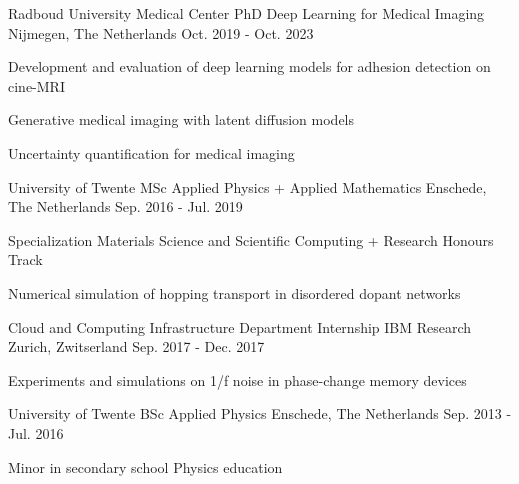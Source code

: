 

\begin{cventries}

  \cventry
    {Radboud University Medical Center} %
    {PhD Deep Learning for Medical Imaging} %
    {Nijmegen, The Netherlands} %
    {Oct. 2019 - Oct. 2023} %
    {
      \begin{cvitems} %
        \item {Development and evaluation of deep learning models for adhesion detection on cine-MRI}
        \item {Generative medical imaging with latent diffusion models}
        \item {Uncertainty quantification for medical imaging}
      \end{cvitems}
    }

  \cventry
    {University of Twente} %
    {MSc Applied Physics + Applied Mathematics} %
    {Enschede, The Netherlands} %
    {Sep. 2016 - Jul. 2019} %
    {
      \begin{cvitems} %
        \item {Specialization Materials Science and Scientific Computing + Research Honours Track}
        \item {Numerical simulation of hopping transport in disordered dopant networks}
      \end{cvitems}
    }

  \cventry
    {Cloud and Computing Infrastructure Department} %
    {Internship IBM Research} %
    {Zurich, Zwitserland} %
    {Sep. 2017 - Dec. 2017} %
    {
      \begin{cvitems} %
        \item {Experiments and simulations on 1/f noise in phase-change memory devices}
      \end{cvitems}
    }

  \cventry
    {University of Twente} %
    {BSc Applied Physics} %
    {Enschede, The Netherlands} %
    {Sep. 2013 - Jul. 2016} %
    {
      \begin{cvitems} %
        \item {Minor in secondary school Physics education}
      \end{cvitems}
    }

\end{cventries}
